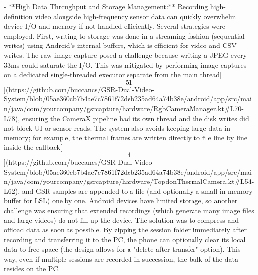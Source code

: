 \documentclass[12pt,a4paper]{article}
\begin{document}
{- **High Data Throughput and Storage Management:** Recording
  high-definition video alongside high-frequency sensor data can quickly
  overwhelm device I/O and memory if not handled efficiently. Several
  strategies were employed. First, writing to storage was done in a
  streaming fashion (sequential writes) using Android's internal
  buffers, which is efficient for video and CSV writes. The raw image
  capture posed a challenge because writing a JPEG every 33ms could
  saturate the I/O. This was mitigated by performing image captures on a
  dedicated single-threaded executor separate from the main
  thread[\[51\]](https://github.com/buccancs/GSR-Dual-Video-System/blob/05ae360cb7b4ae7c7861f72deb235ad64a74b38e/android/app/src/main/java/com/yourcompany/gsrcapture/hardware/RgbCameraManager.kt#L70-L78),
  ensuring the CameraX pipeline had its own thread and the disk writes
  did not block UI or sensor reads. The system also avoids keeping large
  data in memory; for example, the thermal frames are written directly
  to file line by line inside the
  callback[\[4\]](https://github.com/buccancs/GSR-Dual-Video-System/blob/05ae360cb7b4ae7c7861f72deb235ad64a74b38e/android/app/src/main/java/com/yourcompany/gsrcapture/hardware/TopdonThermalCamera.kt#L54-L62),
  and GSR samples are appended to a file (and optionally a small
  in-memory buffer for LSL) one by one. Android devices have limited
  storage, so another challenge was ensuring that extended recordings
  (which generate many image files and large videos) do not fill up the
  device. The solution was to compress and offload data as soon as
  possible. By zipping the session folder immediately after recording
  and transferring it to the PC, the phone can optionally clear its
  local data to free space (the design allows for a "delete after
  transfer" option). This way, even if multiple sessions are recorded in
  succession, the bulk of the data resides on the PC.

}
\end{document}
